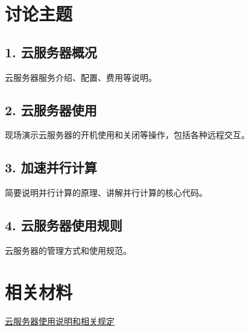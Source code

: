 \documentclass[12pt]{article}
\begin{document}
    \clearpage

    \section*{讨论主题}
        \subsection*{1. 云服务器概况}
            云服务器服务介绍、配置、费用等说明。
        \subsection*{2. 云服务器使用}
            现场演示云服务器的开机使用和关闭等操作，包括各种远程交互。
        \subsection*{3. 加速并行计算}
            简要说明并行计算的原理、讲解并行计算的核心代码。
        \subsection*{4. 云服务器使用规则}
            云服务器的管理方式和使用规范。

    \section*{相关材料}
    \href{https://github.com/Ls-Dai/Cloud-Sever-Tutorial}{云服务器使用说明和相关规定}
\end{document}
